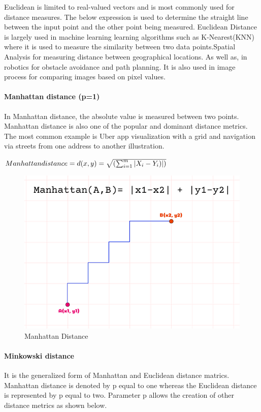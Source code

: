 \documentclass[conference]{IEEEtran}
\begin{document}
Euclidean is limited to real-valued vectors and is most commonly used for distance measures. The below expression is used to determine the straight line between the input point and the other point being measured.  Euclidean Distance is largely used in machine learning learning algorithms such as K-Nearest(KNN) where it is used to measure the similarity between two data points.Spatial Analysis for measuring distance between geographical locations. As well as, in robotics for obstacle avoidance and path planning. It is also used in image process for comparing images based on pixel values. 




\paragraph{Manhattan distance (p=1)}
In Manhattan distance, the absolute value is measured between two points. Manhattan distance is also one of the popular and dominant distance metrics. The most common example is Uber app visualization with a grid and navigation via streets from one address to another illustration.   

\begin{math}
 Manhattan distance = d(x,y)=\sqrt{(\sum_{i=1}^{m} |X_{i} - Y_{i})|)}
 \newline
\end{math}

\begin{figure}
    \centering
    \includegraphics[width=0.5\linewidth]{a.png}
    \caption{Manhattan Distance}
    \label{fig:enter-label}
\end{figure}





\paragraph{Minkowski distance}
It is the generalized form of Manhattan and Euclidean distance matrics. Manhattan distance is denoted by p equal to one whereas the Euclidean distance is represented by p equal to two. Parameter p allows the creation of other distance metrics as shown below.
\end{document}
